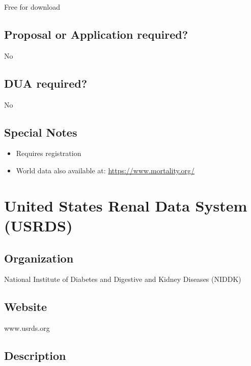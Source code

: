 \documentclass[
]{book}
\providecommand{\tightlist}{%
  \setlength{\itemsep}{0pt}\setlength{\parskip}{0pt}}
\begin{document}
Free for download

\hypertarget{proposal-or-application-required-92}{%
\section{Proposal or Application required?}\label{proposal-or-application-required-92}}

No

\hypertarget{dua-required-92}{%
\section{DUA required?}\label{dua-required-92}}

No

\hypertarget{special-notes-92}{%
\section{Special Notes}\label{special-notes-92}}

\begin{itemize}
\tightlist
\item
  Requires registration
\item
  World data also available at: \url{https://www.mortality.org/}
\end{itemize}

\mainmatter

\hypertarget{united-states-renal-data-system-usrds}{%
\chapter{United States Renal Data System (USRDS)}\label{united-states-renal-data-system-usrds}}

\hypertarget{organization-93}{%
\section{Organization}\label{organization-93}}

National Institute of Diabetes and Digestive and Kidney Diseases (NIDDK)

\hypertarget{website-93}{%
\section{Website}\label{website-93}}

www.usrds.org

\hypertarget{description-93}{%
\section{Description}\label{description-93}}
\end{document}
